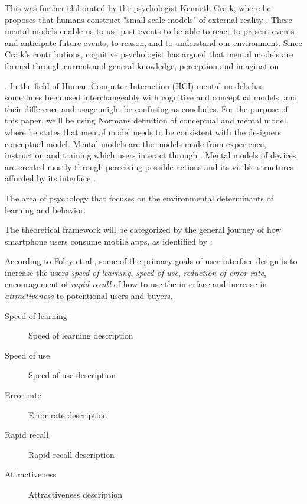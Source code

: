 This was further elaborated by the psychologist Kenneth Craik, where he proposes that humans construct "small-scale models" of external reality \cite{Craik1967}. These mental models enable us to use past events to be able to react to present events and anticipate future events, to reason, and to understand our environment. Since Craik's contributions, cognitive psychologist has argued that mental models are formed through current and general knowledge, perception and imagination \cite{Johnson-Laird2001} . In the field of Human-Computer Interaction (HCI) mental models has sometimes been used interchangeably with cognitive and conceptual models, and their difference and usage might be confusing as \cite{Staggers1993} concludes. For the purpose of this paper, we'll be using Normans \cite{Norman2013a} definition of conceptual and mental model, where he states that mental model needs to be consistent with the designers conceptual model. Mental models are the models made from experience, instruction and training which users interact through \cite{Norman2013a}. Mental models of devices are created mostly through perceiving possible actions and its visible structures afforded by its interface \cite{Norman2013a}.

The area of psychology that focuses on the environmental determinants of learning and behavior.

The theoretical framework will be categorized by the general journey of how smartphone users consume mobile apps, as identified by \cite{IGIGlobal2016}:

According to Foley et al., \cite{Foley1996} some of the primary goals of user-interface design is to increase the users \textit{speed of learning}, \textit{speed of use}, \textit{reduction of error rate}, encouragement of \textit{rapid recall} of how to use the interface and increase in \textit{attractiveness} to potentional users and buyers.

\begin{description}
  \item [Speed of learning] Speed of learning description
  \item [Speed of use] Speed of use description
  \item [Error rate]  Error rate description
  \item [Rapid recall] Rapid recall description
  \item [Attractiveness] Attractiveness description
\end{description}

